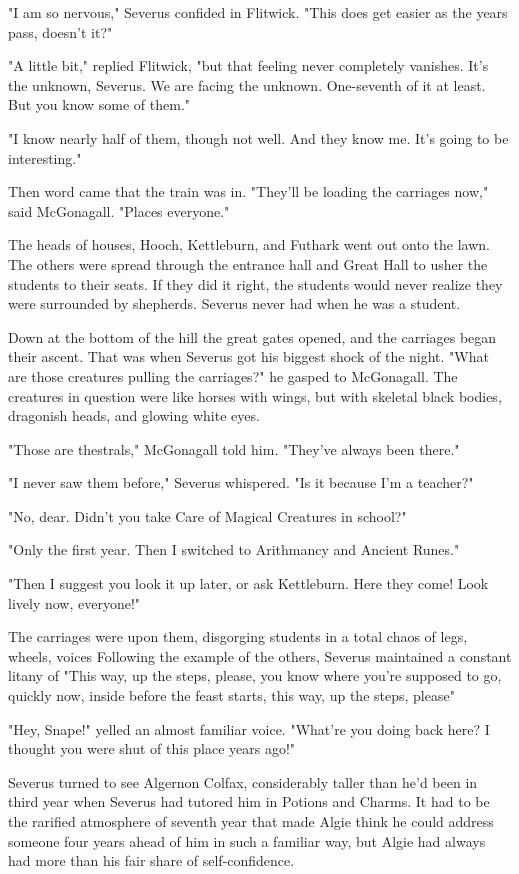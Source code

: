"I am so nervous," Severus confided in Flitwick. "This does get easier as the years pass, doesn't it?"

"A little bit," replied Flitwick, "but that feeling never completely vanishes. It's the unknown, Severus. We are facing the unknown. One-seventh of it at least. But you know some of them."

"I know nearly half of them, though not well. And they know me. It's going to be interesting."

Then word came that the train was in. "They'll be loading the carriages now," said McGonagall. "Places everyone."

The heads of houses, Hooch, Kettleburn, and Futhark went out onto the lawn. The others were spread through the entrance hall and Great Hall to usher the students to their seats. If they did it right, the students would never realize they were surrounded by shepherds. Severus never had when he was a student.

Down at the bottom of the hill the great gates opened, and the carriages began their ascent. That was when Severus got his biggest shock of the night. "What are those creatures pulling the carriages?" he gasped to McGonagall. The creatures in question were like horses with wings, but with skeletal black bodies, dragonish heads, and glowing white eyes.

"Those are thestrals," McGonagall told him. "They've always been there."

"I never saw them before," Severus whispered. "Is it because I'm a teacher?"

"No, dear. Didn't you take Care of Magical Creatures in school?"

"Only the first year. Then I switched to Arithmancy and Ancient Runes."

"Then I suggest you look it up later, or ask Kettleburn. Here they come! Look lively now, everyone!"

The carriages were upon them, disgorging students in a total chaos of legs, wheels, voices{\el} Following the example of the others, Severus maintained a constant litany of "This way, up the steps, please, you know where you're supposed to go, quickly now, inside before the feast starts, this way, up the steps, please{\el}"

"Hey, Snape!" yelled an almost familiar voice. "What're you doing back here? I thought you were shut of this place years ago!"

Severus turned to see Algernon Colfax, considerably taller than he'd been in third year when Severus had tutored him in Potions and Charms. It had to be the rarified atmosphere of seventh year that made Algie think he could address someone four years ahead of him in such a familiar way, but Algie had always had more than his fair share of self-confidence.

